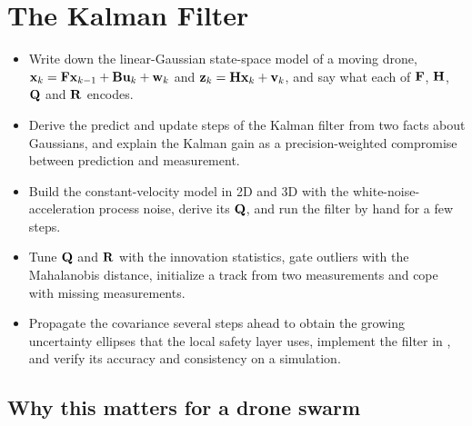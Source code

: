 \chapter{The Kalman Filter}
\label{ch:ch18}

\begin{objectives}
\begin{itemize}
  \item Write down the linear-Gaussian state-space model of a moving drone, $\mathbf{x}_k=\mathbf{F}\mathbf{x}_{k-1}+\mathbf{B}\mathbf{u}_k+\mathbf{w}_k$ and $\mathbf{z}_k=\mathbf{H}\mathbf{x}_k+\mathbf{v}_k$, and say what each of $\mathbf{F}$, $\mathbf{H}$, $\mathbf{Q}$ and $\mathbf{R}$ encodes.
  \item Derive the predict and update steps of the Kalman filter from two facts about Gaussians, and explain the Kalman gain as a precision-weighted compromise between prediction and measurement.
  \item Build the constant-velocity model in 2D and 3D with the white-noise-acceleration process noise, derive its $\mathbf{Q}$, and run the filter by hand for a few steps.
  \item Tune $\mathbf{Q}$ and $\mathbf{R}$ with the innovation statistics, gate outliers with the Mahalanobis distance, initialize a track from two measurements and cope with missing measurements.
  \item Propagate the covariance several steps ahead to obtain the growing uncertainty ellipses that the local safety layer uses, implement the filter in \python, and verify its accuracy and consistency on a simulation.
\end{itemize}
\end{objectives}

\section{Why this matters for a drone swarm}
\label{sec:ch18-motivation}

